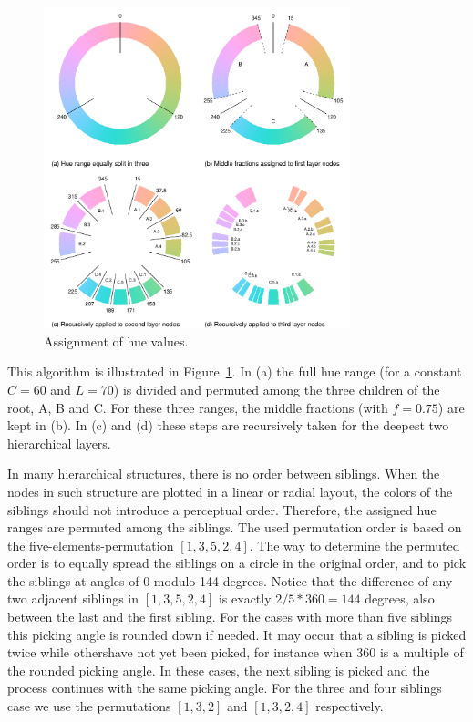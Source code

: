 \documentclass[journal]{vgtc}                %
\begin{document}
\begin{figure}[htb]
  \centering
  \includegraphics[width=3.5in]{hcl_method2.pdf}
  \caption{Assignment of hue values.}\label{fig:wheel}
\end{figure}

This algorithm is illustrated in Figure~\ref{fig:wheel}. In (a) the full hue range (for a constant $C=60$ and $L=70$)  is divided and permuted among the three children of the root, A, B and C. For these three ranges, the middle fractions (with $f=0.75$) are kept in (b).
In (c) and (d) these steps are recursively taken for the deepest two hierarchical layers.

In many hierarchical structures, there is no order between siblings. When the nodes in such structure are plotted in a linear or radial layout, the colors of the siblings should not introduce a perceptual order. Therefore, the assigned hue ranges are permuted among the siblings. The used permutation order is based on the five-elements-permutation $[1, 3, 5, 2, 4]$. The way to determine the permuted order is to equally spread the siblings on a circle in the original order, and to pick the siblings at angles of 0 modulo 144 degrees. Notice that the difference of any two adjacent siblings in $[1, 3, 5, 2, 4]$ is exactly $2/5 * 360=144$ degrees, also between the last and the first sibling. For the cases with more than five siblings this picking angle is rounded down if needed. It may occur that a sibling is picked twice while othershave not yet been picked, for instance when 360 is a multiple of the rounded picking angle. In these cases, the next sibling is picked and the process continues with the same picking angle. For the three and four siblings case we use the permutations $[1, 3, 2]$ and $[1, 3, 2, 4]$ respectively. 
\end{document}
